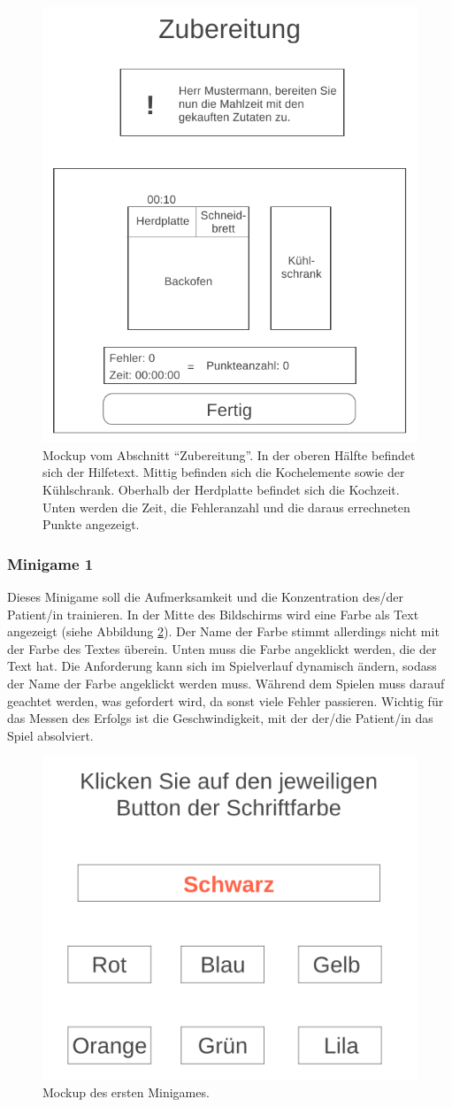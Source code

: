 \begin{figure}[H]
    \centering
	\includegraphics[width=0.6\linewidth]{figures/development/mockup/preparation.png}
	\caption{Mockup vom Abschnitt \enquote{Zubereitung}. In der oberen Hälfte befindet sich der Hilfetext. Mittig befinden sich die Kochelemente sowie der Kühlschrank. Oberhalb der Herdplatte befindet sich die Kochzeit. Unten werden die Zeit, die Fehleranzahl und die daraus errechneten Punkte angezeigt.}
	\label{fig:mockup-preparation}
\end{figure}

\subsubsection{Minigame 1}
Dieses Minigame soll die Aufmerksamkeit und die Konzentration des/der Patient/in trainieren. In der Mitte des Bildschirms wird eine Farbe als Text angezeigt (siehe Abbildung \ref{fig:minigame-1}). Der Name der Farbe stimmt allerdings nicht mit der Farbe des Textes überein. Unten muss die Farbe angeklickt werden, die der Text hat. Die Anforderung kann sich im Spielverlauf dynamisch ändern, sodass der Name der Farbe angeklickt werden muss. Während dem Spielen muss darauf geachtet werden, was gefordert wird, da sonst viele Fehler passieren. Wichtig für das Messen des Erfolgs ist die Geschwindigkeit, mit der der/die Patient/in das Spiel absolviert.

\begin{figure}[H]
    \centering
	\includegraphics[width=0.6\linewidth]{figures/development/minigame/minigame-1.png}
	\caption{Mockup des ersten Minigames.}
	\label{fig:minigame-1}
\end{figure}

